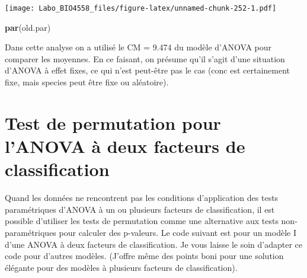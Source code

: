\documentclass[
  12pt,
]{book}
\newenvironment{Shaded}{\begin{snugshade}}{\end{snugshade}}
\newcommand{\KeywordTok}[1]{\textcolor[rgb]{0.13,0.29,0.53}{\textbf{#1}}}
\newcommand{\NormalTok}[1]{#1}
\begin{document}
\texttt{[image: Labo\_BIO4558\_files/figure-latex/unnamed-chunk-252-1.pdf]}

\begin{Shaded}
\begin{Highlighting}[]
\KeywordTok{par}\NormalTok{(old.par)}
\end{Highlighting}
\end{Shaded}

Dans cette analyse on a utilisé le CM = 9.474 du modèle d'ANOVA pour comparer les moyennes. En ce faisant, on présume qu'il s'agit d'une situation d'ANOVA à effet fixes, ce qui n'est peut-être pas le cas (conc est certainement fixe, mais species peut être fixe ou aléatoire).

\hypertarget{test-de-permutation-pour-lanova-uxe0-deux-facteurs-de-classification}{%
\section{Test de permutation pour l'ANOVA à deux facteurs de classification}\label{test-de-permutation-pour-lanova-uxe0-deux-facteurs-de-classification}}

Quand les données ne rencontrent pas les conditions d'application des tests paramétriques d'ANOVA à un ou plusieurs facteurs de classification, il est possible d'utiliser les tests de permutation comme une alternative aux tests non-paramétriques pour calculer des p-valeurs. Le code suivant est pour un modèle I d'une ANOVA à deux facteurs de classification. Je vous laisse le soin d'adapter ce code pour d'autres modèles. (J'offre même des points boni pour une solution élégante pour des modèles à plusieurs facteurs de classification).
\end{document}
